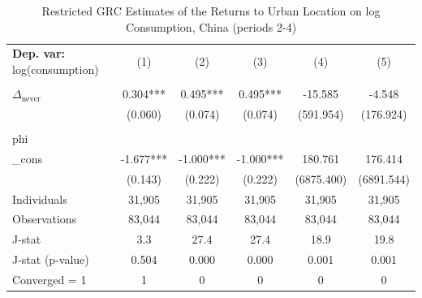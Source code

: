 \begin{table}[htbp] \centering \begin{threeparttable}
 \caption{Restricted GRC Estimates of the Returns to Urban Location on log Consumption, China (periods 2-4)} 
 \label{tab:GRC_CHN234_consumption_urban_unb} 
\begin{tabular}{l ccccc} \toprule  \textbf{Dep. var:}  log(consumption) 
                    &\multicolumn{1}{c}{(1)}   &\multicolumn{1}{c}{(2)}   &\multicolumn{1}{c}{(3)}   &\multicolumn{1}{c}{(4)}   &\multicolumn{1}{c}{(5)}   \\
                    &               &               &               &               &               \\
\addlinespace
$\Delta_{\text{never}}$&       0.304***&       0.495***&       0.495***&     -15.585   &      -4.548   \\
                    &     (0.060)   &     (0.074)   &     (0.074)   &   (591.954)   &   (176.924)   \\
                    &               &               &               &               &               \\
\addlinespace
phi                 &               &               &               &               &               \\
_cons               &      -1.677***&      -1.000***&      -1.000***&     180.761   &     176.414   \\
                    &     (0.143)   &     (0.222)   &     (0.222)   &  (6875.400)   &  (6891.544)   \\
\addlinespace
Individuals         &      31,905   &      31,905   &      31,905   &      31,905   &      31,905   \\
Observations        &      83,044   &      83,044   &      83,044   &      83,044   &      83,044   \\
J-stat              &         3.3   &        27.4   &        27.4   &        18.9   &        19.8   \\
J-stat (p-value)    &       0.504   &       0.000   &       0.000   &       0.001   &       0.001   \\
Converged = 1       &           1   &           0   &           0   &           0   &           0   \\

\end{tabular}
\end{threeparttable}
\end{table}
